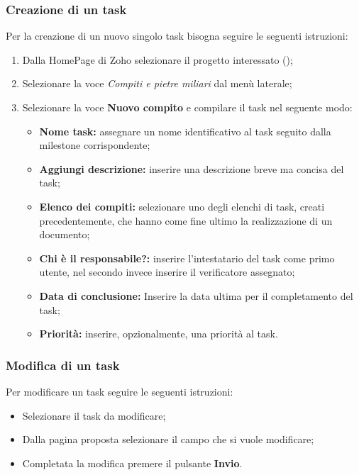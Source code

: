 \subsubsection{Creazione di un task}
Per la creazione di un nuovo singolo task bisogna seguire le seguenti 
istruzioni:
\begin{enumerate}
  \item Dalla HomePage di Zoho selezionare il progetto interessato (\progetto);
  \item Selezionare la voce \textsl{Compiti e pietre miliari} dal menù laterale;
  \item Selezionare la voce \textbf{Nuovo compito} e compilare il task nel 
  seguente modo:
    \begin{itemize}
      \item \textbf{Nome task:} assegnare un nome identificativo al task seguito dalla milestone corrispondente;
      \item \textbf{Aggiungi descrizione:} inserire una descrizione breve ma 
      concisa del task;
      \item \textbf{Elenco dei compiti:} selezionare uno degli elenchi di 
      task, creati precedentemente, che hanno come fine ultimo la realizzazione di un 
      documento;
      \item \textbf{Chi è il responsabile?:} inserire l'intestatario del task 
      come primo utente, nel secondo invece inserire il verificatore assegnato;
      \item \textbf{Data di conclusione:} Inserire la data ultima per il 
      completamento del task;
     \item \textbf{Priorità:} inserire, opzionalmente, una priorità al task.
    \end{itemize}
\end{enumerate}


\subsubsection{Modifica di un task}
Per modificare un task seguire le seguenti istruzioni:
\begin{itemize}
  \item Selezionare il task da modificare;
  \item Dalla pagina proposta selezionare il campo che si vuole modificare;
  \item Completata la modifica premere il pulsante \textbf{Invio}.
\end{itemize}

